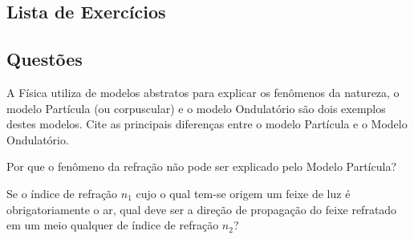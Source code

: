 \begin{center}
    \section{Lista de Exercícios}    
\end{center}

\subsection{Questões}

\begin{quest}
    A Física utiliza de modelos abstratos para explicar os fenômenos da natureza, o modelo Partícula (ou corpuscular) e o modelo Ondulatório são dois exemplos destes modelos. Cite as principais diferenças entre o modelo Partícula e o Modelo Ondulatório.
\end{quest}
\begin{quest}
    Por que o fenômeno da refração não pode ser explicado pelo Modelo Partícula?            
\end{quest}
\begin{quest}
    Se o índice de refração $n_1$ cujo o qual tem-se origem um feixe de luz é obrigatoriamente o ar, qual deve ser a direção de propagação do feixe refratado em um meio qualquer de índice de refração $n_2$?
\end{quest}
